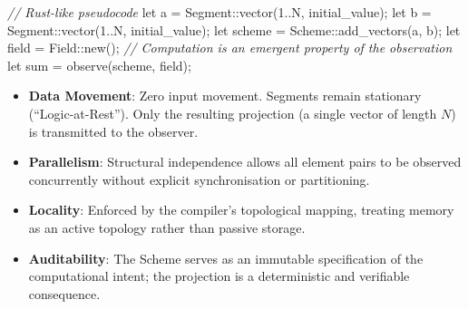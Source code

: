 \documentclass[
  a4paper,
  DIV=11,
  numbers=noendperiod]{scrartcl}
\newenvironment{Shaded}{\begin{snugshade}}{\end{snugshade}}
\newcommand{\CommentTok}[1]{\textcolor[rgb]{0.00,0.00,0.00}{\textit{#1}}}
\newcommand{\DecValTok}[1]{\textcolor[rgb]{0.00,0.00,0.00}{#1}}
\newcommand{\KeywordTok}[1]{\textcolor[rgb]{0.00,0.00,0.00}{#1}}
\newcommand{\NormalTok}[1]{\textcolor[rgb]{0.00,0.00,0.00}{#1}}
\newcommand{\OperatorTok}[1]{\textcolor[rgb]{0.00,0.00,0.00}{#1}}
\newcommand{\PreprocessorTok}[1]{\textcolor[rgb]{0.00,0.00,0.00}{#1}}
\providecommand{\tightlist}{%
  \setlength{\itemsep}{0pt}\setlength{\parskip}{0pt}}
\begin{document}
\begin{Shaded}
\begin{Highlighting}[]
\CommentTok{// Rust{-}like pseudocode}
\KeywordTok{let}\NormalTok{ a }\OperatorTok{=} \PreprocessorTok{Segment::}\NormalTok{vector(}\DecValTok{1}\OperatorTok{..}\NormalTok{N}\OperatorTok{,}\NormalTok{ initial\_value)}\OperatorTok{;}
\KeywordTok{let}\NormalTok{ b }\OperatorTok{=} \PreprocessorTok{Segment::}\NormalTok{vector(}\DecValTok{1}\OperatorTok{..}\NormalTok{N}\OperatorTok{,}\NormalTok{ initial\_value)}\OperatorTok{;}
\KeywordTok{let}\NormalTok{ scheme }\OperatorTok{=} \PreprocessorTok{Scheme::}\NormalTok{add\_vectors(a}\OperatorTok{,}\NormalTok{ b)}\OperatorTok{;}
\KeywordTok{let}\NormalTok{ field }\OperatorTok{=} \PreprocessorTok{Field::}\NormalTok{new()}\OperatorTok{;}
\CommentTok{// Computation is an emergent property of the observation}
\KeywordTok{let}\NormalTok{ sum }\OperatorTok{=}\NormalTok{ observe(scheme}\OperatorTok{,}\NormalTok{ field)}\OperatorTok{;} 
\end{Highlighting}
\end{Shaded}

\begin{itemize}
\tightlist
\item
  \textbf{Data Movement}: Zero input movement. Segments remain
  stationary (``Logic-at-Rest''). Only the resulting projection (a
  single vector of length \(N\)) is transmitted to the observer.
\item
  \textbf{Parallelism}: Structural independence allows all element pairs
  to be observed concurrently without explicit synchronisation or
  partitioning.
\item
  \textbf{Locality}: Enforced by the compiler's topological mapping,
  treating memory as an active topology rather than passive storage.
\item
  \textbf{Auditability}: The Scheme serves as an immutable specification
  of the computational intent; the projection is a deterministic and
  verifiable consequence.
\end{itemize}
\end{document}
